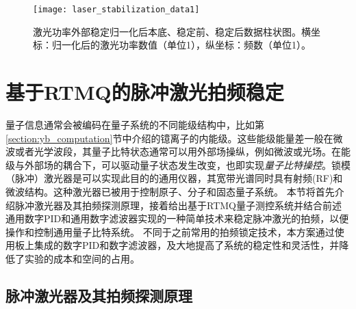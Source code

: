 \begin{figure}
    \centering
    \texttt{[image: laser\_stabilization\_data1]}
    \caption[激光功率外部稳定柱状图对比数据]{激光功率外部稳定归一化后本底、稳定前、稳定后数据柱状图。横坐标：归一化后的激光功率数值（单位1），纵坐标：频数（单位1）。\label{fig:laser_stabilization_data1}}
\end{figure}












\newpage
\section[基于RTMQ的脉冲激光拍频稳定]{基于RTMQ的脉冲激光拍频稳定\label{section:pulsed_laser_locking}}

量子信息通常会被编码在量子系统的不同能级结构中，比如第\ref{section:yb_computation}节中介绍的镱离子的内能级。这些能级能量差一般在微波或者光学波段，其量子比特状态通常可以用外部场操纵，例如微波或光场。在能级与外部场的耦合下，可以驱动量子状态发生改变，也即实现\emph{量子比特操控}。锁模（脉冲）激光器是可以实现此目的的通用仪器，其宽带光谱同时具有射频(RF)和微波结构。这种激光器已被用于控制原子\cite[]{Hayes_Matsukevich_Maunz_Hucul_Quraishi_Olmschenk_Campbell_Mizrahi_Senko_Monroe_2010}、分子\cite[]{Peer_Shapiro_Stowe_Shapiro_Ye_2007}和固态量子系统\cite[]{Greve_Press_McMahon_Yamamoto_2013}。
本节将首先介绍脉冲激光器及其拍频探测原理，接着给出基于RTMQ量子测控系统并结合前述通用数字PID和通用数字滤波器实现的一种简单技术来稳定脉冲激光的拍频，以便操作和控制通用量子比特系统\cite[]{ladd2010quantum}。
不同于之前常用的拍频锁定技术\cite[]{Islam_Campbell_Choi_Clark_Conover_Debnath_Edwards_Fields_Hayes_Hucul_et_al_2014}，本方案通过使用板上集成的数字PID和数字滤波器，及大地提高了系统的稳定性和灵活性，并降低了实验的成本和空间的占用。


\subsection[脉冲激光器及其拍频探测原理]{脉冲激光器及其拍频探测原理}
